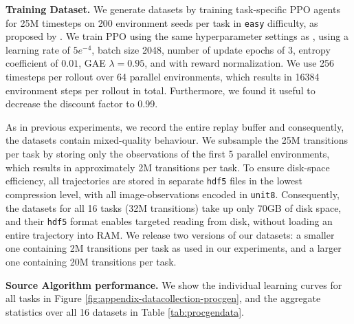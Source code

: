 \textbf{Training Dataset.}
We generate datasets by training task-specific PPO agents for 25M timesteps on 200 environment seeds per task in \texttt{easy} difficulty, as proposed by \citet{Cobbe:20}.
We train PPO using the same hyperparameter settings as \citet{Cobbe:20}, using a learning rate of $5e^{-4}$, batch size 2048, number of update epochs of 3, entropy coefficient of $0.01$, GAE $\lambda=0.95$, and with reward normalization.
We use 256 timesteps per rollout over 64 parallel environments, which results in 16384 environment steps per rollout in total. 
Furthermore, we found it useful to decrease the discount factor to 0.99.

As in previous experiments, we record the entire replay buffer and consequently, the datasets contain mixed-quality behaviour.
We subsample the 25M transitions per task by storing only the observations of the first 5 parallel environments, which results in approximately 2M transitions per task. 
To ensure disk-space efficiency, all trajectories are stored in separate \texttt{hdf5} files in the lowest compression level, with all image-observations encoded in \texttt{unit8}.
Consequently, the datasets for all 16 tasks (32M transitions) take up only 70GB of disk space, and their \texttt{hdf5} format enables targeted reading from disk, without loading an entire trajectory into RAM.
We release two versions of our datasets: a smaller one containing 2M transitions per task as used in our experiments, and a larger one containing 20M transitions per task.

\textbf{Source Algorithm performance.}
We show the individual learning curves for all tasks in Figure \ref{fig:appendix-datacollection-procgen}, and the aggregate statistics over all 16 datasets in Table \ref{tab:procgendata}. 


